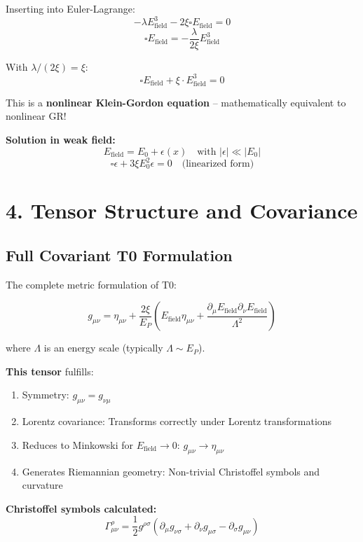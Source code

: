 	Inserting into Euler-Lagrange:
	\[
	-\lambda E_{\text{field}}^3 - 2\xi \square E_{\text{field}} = 0
	\]
	\[
	\square E_{\text{field}} = -\frac{\lambda}{2\xi} E_{\text{field}}^3
	\]
	
	With $\lambda/(2\xi) = \xi$:
	\[
	\boxed{\square E_{\text{field}} + \xi \cdot E_{\text{field}}^3 = 0}
	\]
	
	This is a \textbf{nonlinear Klein-Gordon equation} – mathematically equivalent to nonlinear GR!
	
	\textbf{Solution in weak field:}
	\[
	E_{\text{field}} = E_0 + \epsilon(x) \quad \text{with } |\epsilon| \ll |E_0|
	\]
	\[
	\square \epsilon + 3\xi E_0^2 \epsilon = 0 \quad \text{(linearized form)}
	\]
	
	\section*{4. Tensor Structure and Covariance}
	
	\subsection*{\textbf{Full Covariant T0 Formulation}}
	
	The complete metric formulation of T0:
	
	\[
	g_{\mu\nu} = \eta_{\mu\nu} + \frac{2\xi}{E_P} \left(E_{\text{field}} \eta_{\mu\nu} + \frac{\partial_\mu E_{\text{field}} \partial_\nu E_{\text{field}}}{\Lambda^2}\right)
	\]
	
	where $\Lambda$ is an energy scale (typically $\Lambda \sim E_P$).
	
	\textbf{This tensor} fulfills:
	\begin{enumerate}[label=\checkmark]
		\item Symmetry: $g_{\mu\nu} = g_{\nu\mu}$
		\item Lorentz covariance: Transforms correctly under Lorentz transformations
		\item Reduces to Minkowski for $E_{\text{field}} \to 0$: $g_{\mu\nu} \to \eta_{\mu\nu}$
		\item Generates Riemannian geometry: Non-trivial Christoffel symbols and curvature
	\end{enumerate}
	
	\textbf{Christoffel symbols calculated:}
	\[
	\Gamma^\rho_{\mu\nu} = \frac{1}{2} g^{\rho\sigma} (\partial_\mu g_{\nu\sigma} + \partial_\nu g_{\mu\sigma} - \partial_\sigma g_{\mu\nu})
	\]
	
